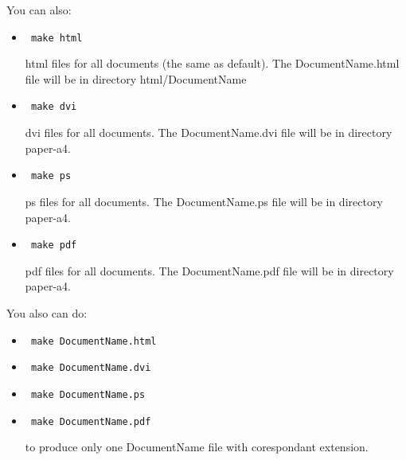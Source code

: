 \documentclass{howto}
\begin{document}
You can also: 
\begin{itemize}

  \item \begin{verbatim} make html \end{verbatim}


   html files for all documents (the same as default). The DocumentName.html
   file will be in directory html/DocumentName 
  
  \item \begin{verbatim} make dvi \end{verbatim}


   dvi files for all documents. The DocumentName.dvi
   file will be in directory paper-a4. 

  \item \begin{verbatim} make ps \end{verbatim}


   ps files for all documents. The DocumentName.ps
   file will be in directory paper-a4. 

  \item \begin{verbatim} make pdf \end{verbatim}


   pdf files for all documents. The DocumentName.pdf
   file will be in directory paper-a4. 

\end{itemize}

You also can do:

\begin{itemize}
  \item \begin{verbatim} make DocumentName.html \end{verbatim}
  \item \begin{verbatim} make DocumentName.dvi \end{verbatim}
  \item \begin{verbatim} make DocumentName.ps \end{verbatim}
  \item \begin{verbatim} make DocumentName.pdf \end{verbatim}

to produce only one DocumentName file with corespondant extension.
\end{itemize}
\end{document}
